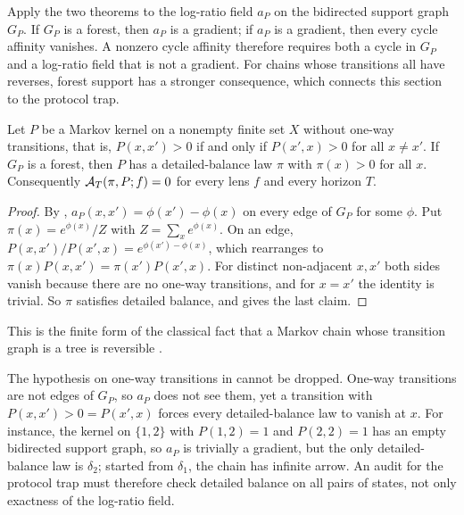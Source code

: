 Apply the two theorems to the log-ratio field $a_P$ on the bidirected support graph $G_P$.
If $G_P$ is a forest, then $a_P$ is a gradient; if $a_P$ is a gradient, then every cycle affinity vanishes.
A nonzero cycle affinity therefore requires both a cycle in $G_P$ and a log-ratio field that is not a gradient.
For chains whose transitions all have reverses, forest support has a stronger consequence, which connects this section to the protocol trap.

\begin{corollary}\label{cor:forest_reversible}
Let $P$ be a Markov kernel on a nonempty finite set $X$ without one-way transitions, that is, $P(x,x')>0$ if and only if $P(x',x)>0$ for all $x\ne x'$.
If $G_P$ is a forest, then $P$ has a detailed-balance law $\pi$ with $\pi(x)>0$ for all $x$.
Consequently $\mathcal{A}_T(\pi,P;f)=0$ for every lens $f$ and every horizon $T$.
\end{corollary}

\begin{proof}
By \thmNGForceForest, $a_P(x,x')=\phi(x')-\phi(x)$ on every edge of $G_P$ for some $\phi$.
Put $\pi(x)=e^{\phi(x)}/Z$ with $Z=\sum_{x}e^{\phi(x)}$.
On an edge, $P(x,x')/P(x',x)=e^{\phi(x')-\phi(x)}$, which rearranges to $\pi(x)P(x,x')=\pi(x')P(x',x)$.
For distinct non-adjacent $x,x'$ both sides vanish because there are no one-way transitions, and for $x=x'$ the identity is trivial.
So $\pi$ satisfies detailed balance, and \thmNGProtocolTrap{} gives the last claim.
\end{proof}

This is the finite form of the classical fact that a Markov chain whose transition graph is a tree is reversible \citep{Kelly1979}.

\begin{remark}\label{rem:one_way}
The hypothesis on one-way transitions in  cannot be dropped.
One-way transitions are not edges of $G_P$, so $a_P$ does not see them, yet a transition with $P(x,x')>0=P(x',x)$ forces every detailed-balance law to vanish at $x$.
For instance, the kernel on $\{1,2\}$ with $P(1,2)=1$ and $P(2,2)=1$ has an empty bidirected support graph, so $a_P$ is trivially a gradient, but the only detailed-balance law is $\delta_2$; started from $\delta_1$, the chain has infinite arrow.
An audit for the protocol trap must therefore check detailed balance on all pairs of states, not only exactness of the log-ratio field.
\end{remark}

